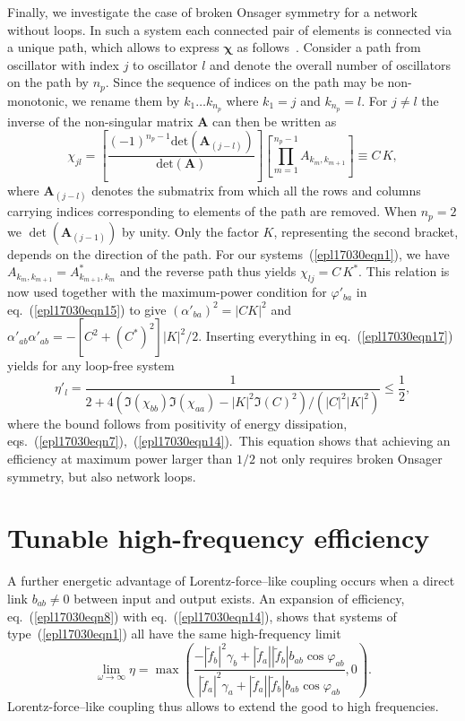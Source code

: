 \documentclass[doublecol,final,edchoice]{epl2}
\begin{document}
Finally, we investigate the case of broken Onsager symmetry for a network without loops. In such a system each connected pair of elements is connected via a unique path, which allows to express $\bm{\chi}$ as follows~\cite{epl17030bib20}. Consider a path from oscillator with index $j$ to oscillator $l$ and denote the overall number of oscillators on the path by $n_p$. Since the sequence of indices on the path may be non-monotonic, we rename them by $k_1\ldots k_{n_p}$ where $k_1=j$ and $k_{n_p}=l$. For $j\neq l$ the inverse of the non-singular matrix $\mathbf{A}$ can then be written as
\begin{equation}%
\chi_{jl} = \left[\frac{(-1)^{n_p-1}\mathrm{det}(\mathbf{A}_{(j-l)})}{\mathrm{det}(\mathbf{A})}\right]\left[\prod^{n_p -1}_{m=1} A_{k_m,k_{m+1}}\right] \equiv C\,K,
\label{epl17030eqn19}
\end{equation}
where $\mathbf{A}_{(j-l)}$ denotes the submatrix from which all the rows and columns carrying indices corresponding to elements of the path are removed. When $n_p = 2$ we  $\det(\textbf{A}_{(j-1)})$ by unity. Only the factor $K$, representing the second bracket, depends on the direction of the path. For our systems~(\ref{epl17030eqn1}), we have $A_{k_m,k_{m+1}}=A_{k_{m+1},k_{m}}^{*}$ and the reverse path thus yields $\chi_{lj} = C\,K^{*}$. This relation is now used together with the maximum-power condition for $\varphi'_{ba}$ in eq.~(\ref{epl17030eqn15}) to give $(\alpha'_{ba})^2 = |CK|^2$ and $\alpha'_{ab}\alpha'_{ab} = -[C^2+(C^*)^2]|K|^2/2$. Inserting everything in eq.~(\ref{epl17030eqn17}) yields for any loop-free system
\begin{equation}%
\eta'_{l} = \frac{1}{2 + 4\left(\Im(\chi_{bb})\Im(\chi_{aa}) - |K|^2 \Im(C)^2\right)/(|C|^2 |K|^2)} \leq \frac{1}{2},
\label{epl17030eqn20}
\end{equation}
where the bound follows from positivity of energy dissipation, eqs.~(\ref{epl17030eqn7}),~(\ref{epl17030eqn14}).~This equation shows that achieving an efficiency at maximum power larger than $1/2$ not only requires broken Onsager symmetry, but also network loops.

\section{Tunable high-frequency efficiency}

A further energetic advantage of Lorentz-force--like coupling occurs when a direct link $b_{ab}\neq 0$ between input and output exists. An expansion of efficiency, eq.~(\ref{epl17030eqn8}) with eq.~(\ref{epl17030eqn14}), shows that systems of type~(\ref{epl17030eqn1}) all have the same high-frequency limit
\begin{equation}%
\lim\limits_{\omega \rightarrow \infty} \eta = \max\left(\frac{-|\tilde{f}_b|^2 \gamma_b + |\tilde{f}_a| |\tilde{f}_b| b_{ab} \cos{\varphi_{ab}}}{|\tilde{f}_a|^2 \gamma_a + |\tilde{f}_a||\tilde{f}_b| b_{ab} \cos{\varphi_{ab}}},0\right).
\label{epl17030eqn21}
\end{equation}
Lorentz-force--like coupling thus allows to extend the good  to high frequencies.
\end{document}
